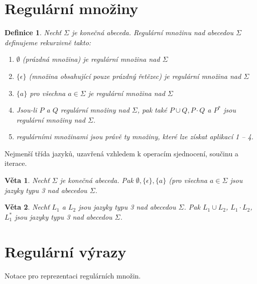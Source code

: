 \documentclass[a4paper, 11pt]{report}
\newtheorem{mydef}{Definice}[chapter]
\newtheorem{veta}{Věta}[chapter]
\begin{document}
\section{Regulární množiny}

\begin{mydef}
Nechť $\Sigma$ je konečná abeceda. \emph{Regulární množinu} nad abecedou $\Sigma$ definujeme rekurzivně takto:
\begin{enumerate}
	\item $\emptyset$ (prázdná množina) je regulární množina nad $\Sigma$
	\item $\{ \epsilon \}$ (množina obsahující pouze prázdný řetězec) je regulární množina nad $\Sigma$
	\item $\{ a \}$ pro všechna $a \in \Sigma$ je regulární množina nad $\Sigma$
	\item Jsou-li $P$ a $Q$ regulární množiny nad $\Sigma$, pak také $P \cup Q, P \cdot Q$ a $P^*$ jsou regulární množiny nad $\Sigma$.
	\item regulárními množinami jsou právě ty množiny, které lze získat aplikací 1 -- 4.
\end{enumerate}
\end{mydef}
Nejmenší třída jazyků, uzavřená vzhledem k operacím sjednocení, součinu a iterace.

\begin{veta}
Nechť $\Sigma$ je konečná abeceda. Pak $\emptyset, \{\epsilon\}, \{a\}$ (pro všechna $a \in \Sigma$ jsou jazyky typu 3 nad abecedou $\Sigma$.
\end{veta}

\begin{veta}
Nechť $L_1$ a $L_2$ jsou jazyky typu 3 nad abecedou $\Sigma$. Pak $L_1 \cup L_2$, $L_1 \cdot L_2$, $L_1^*$ jsou jazyky typu 3 nad abecedou $\Sigma$.
\end{veta}

\section{Regulární výrazy}

Notace pro reprezentaci regulárních množin.
\end{document}
